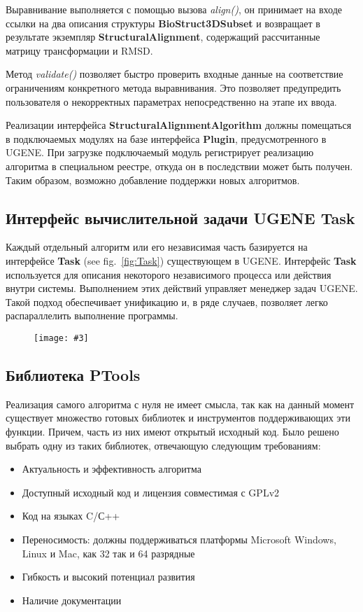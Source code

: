 \documentclass[a4paper, 12pt, titlepage, utf8]{extarticle}
\newenvironment{myfigure}[2]%
{\pushQED{\caption{#1} \label{#2}} %
    \begin{figure}[h!tb]\centering } %
{  \popQED %
    \end{figure}}
\newcommand{\includefigure}[3][]{
\begin{myfigure}{#2}{fig:#3}
    \texttt{[image: \#3]}
\end{myfigure}
}
\newcommand{\lookat}[1]{see fig.~\ref{#1}}
\newcommand{\class}{\textbf}
\newcommand{\method}{\textit}
\begin{document}
\begin{original}
\begin{original}
\begin{original}
Выравнивание выполняется с помощью вызова \method{align()}, он принимает на
входе ссылки на два описания структуры \class{BioStruct3DSubset} и возвращает в
результате экземпляр \class{StructuralAlignment}, содержащий рассчитанные
матрицу трансформации и RMSD.

Метод \method{validate()} позволяет быстро проверить входные данные на
соответствие ограничениям конкретного метода выравнивания. Это позволяет
предупредить пользователя о некорректных параметрах непосредственно на этапе их
ввода.

Реализации интерфейса \class{StructuralAlignmentAlgorithm} должны помещаться в
подключаемых модулях на базе интерфейса \class{Plugin}, предусмотренного в
UGENE. При загрузке подключаемый модуль регистрирует реализацию алгоритма в
специальном реестре, откуда он в последствии может быть получен. Таким образом,
возможно добавление поддержки новых алгоритмов.

\subsection{Интерфейс вычислительной задачи UGENE Task}
Каждый отдельный алгоритм или его независимая часть базируется на интерфейсе
\class{Task} (\lookat{fig:Task}) существующем в UGENE. Интерфейс \class{Task}
используется для описания некоторого независимого процесса или действия внутри
системы. Выполнением этих действий управляет менеджер задач UGENE. Такой подход
обеспечивает унификацию и, в ряде случаев, позволяет легко распараллелить
выполнение программы.

\includefigure[scale=0.6]{Интерфейс вычислительной задачи}{Task}

\subsection{Библиотека PTools}
Реализация самого алгоритма с нуля не имеет смысла, так как на данный момент
существует множество готовых библиотек и инструментов поддерживающих эти
функции. Причем, часть из них имеют открытый исходный код. Было решено выбрать
одну из таких библиотек, отвечающую следующим требованиям:

\begin{itemize}
    \item Актуальность и эффективность алгоритма
    \item Доступный исходный код и лицензия совместимая с GPLv2 \cite{gpl}
    \item Код на языках C/С++
    \item Переносимость: должны поддерживаться платформы Microsoft Windows,
Linux и Mac, как 32 так и 64 разрядные
    \item Гибкость и высокий потенциал развития
    \item Наличие документации
\end{itemize}


\end{original}
\end{original}
\end{original}
\end{document}
